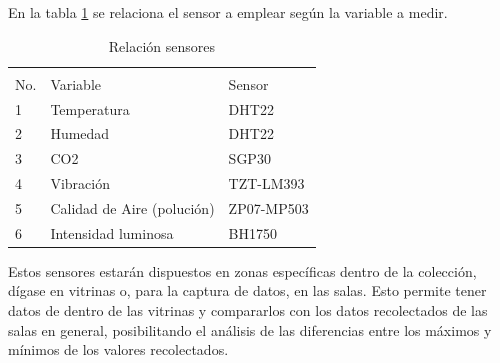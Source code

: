 En la tabla \ref{tab:relacion_sensores} se relaciona el sensor a emplear según la variable a medir.

    \begin{table}[h]
        \centering
        \caption{Relación sensores}
        \label{tab:relacion_sensores}
        \begin{tabular}{|l|l|l|}
        \hline
        \cellcolor[HTML]{9698ED}                      & \cellcolor[HTML]{9698ED}                           & \cellcolor[HTML]{9698ED}                         \\
        \multirow{-2}{*}{\cellcolor[HTML]{9698ED}No.} & \multirow{-2}{*}{\cellcolor[HTML]{9698ED}Variable} & \multirow{-2}{*}{\cellcolor[HTML]{9698ED}Sensor} \\ \hline
        1                                             & Temperatura                                        & DHT22                                            \\ \hline
        2                                             & Humedad                                            & DHT22                                            \\ \hline
        3                                             & CO2                                                & SGP30                                            \\ \hline
        4                                             & Vibración                                          & TZT-LM393                                        \\ \hline
        5                                             & Calidad de Aire (polución)                         & ZP07-MP503                                       \\ \hline
        6                                             & Intensidad luminosa                                & BH1750                                           \\ \hline
        \end{tabular}
    \end{table}

Estos sensores estarán dispuestos en zonas específicas dentro de la colección, dígase en vitrinas o, para la captura de datos, en las salas.
Esto permite tener datos de dentro de las vitrinas y compararlos con los datos recolectados de las salas en general, posibilitando el análisis de las diferencias entre los máximos y mínimos de los valores recolectados.
    
